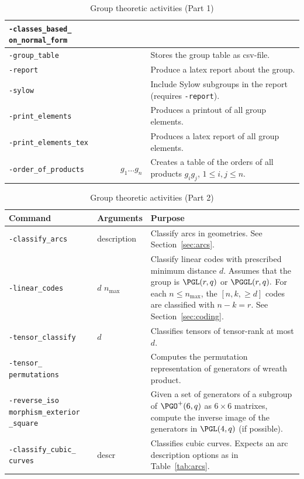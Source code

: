 \begin{table}
\begin{center}
\begin{tabular}{|p{4cm}|p{3cm}|p{8cm}|}
\hline
\verb'-classes_based_' \verb'on_normal_form' & & \\
\hline
\verb'-group_table' & & 
Stores the group table as csv-file. \\
\hline
\verb'-report' & & 
Produce a latex report about the group. \\
\hline
\verb'-sylow' & & 
Include Sylow subgroups in the report (requires \verb'-report'). \\
\hline
\verb'-print_elements' & & 
Produces a printout of all group elements. \\
\hline
\verb'-print_elements_tex' & & 
Produces a latex report of all group elements. \\
\hline
\verb'-order_of_products' & $g_1 \ldots g_n$ & 
Creates a table of the orders of all products $g_ig_j$, $1 \le i,j \le n.$\\
\hline
\end{tabular}
\end{center}
\caption{\label{tab:grouptasks}Group theoretic activities (Part 1)}
\end{table}
\begin{table}
\begin{center}
\begin{tabular}{|p{4cm}|p{3cm}|p{8cm}|}
\hline
Command & Arguments & Purpose \\
\hline
\hline
\verb'-classify_arcs' & description & 
Classify arcs in geometries. See Section~\ref{sec:arcs}.\\
\hline
\verb'-linear_codes' & $d$ $n_{\max}$ & 
Classify linear codes with prescribed minimum distance $d$. 
Assumes that the group is $\PGL(r,q)$ or $\PGGL(r,q).$ 
For each $n \le n_{\max}$, the $[n,k, \ge d]$ codes are classified with $n-k=r$. 
See Section~\ref{sec:coding}. \\
\hline
\verb'-tensor_classify' & $d$ & Classifies tensors of tensor-rank at most $d.$ \\
\hline
\verb'-tensor_' \verb'permutations' &  & 
Computes the permutation representation of generators of wreath product. \\
\hline
\verb'-reverse_iso' \verb'morphism_exterior' \verb'_square' & & 
Given a set of generators of a subgroup of $\PGO^+(6,q)$ as $6\times 6$ matrixes, 
compute the inverse image of the generators in $\PGL(4,q)$ (if possible).\\
\hline
\verb'-classify_cubic_' \verb'curves' & descr & 
Classifies cubic curves. 
Expects an arc description options as in Table~\ref{tab:arcs}. \\
\hline
\end{tabular}
\end{center}
\caption{\label{tab:grouptasks2}Group theoretic activities (Part 2)}
\end{table}

